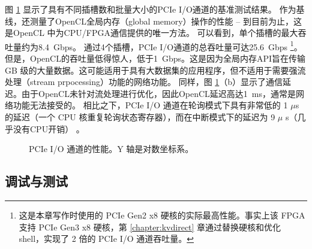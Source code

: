 图 \ref {clicknp:fig:pcie} 显示了具有不同插槽数和批量大小的PCIe I/O通道的基准测试结果。
作为基线，还测量了OpenCL全局内存（global memory）操作的性能 -- 到目前为止，这是OpenCL \cite {opencl} 中为CPU/FPGA通信提供的唯一方法。
可以看到，单个插槽的最大吞吐量约为8.4~Gbps。
通过4个插槽，PCIe I/O通道的总吞吐量可达25.6~Gbps \footnote{这是本章写作时使用的 PCIe Gen2 x8 硬核的实际最高性能。事实上该 FPGA 支持 PCIe Gen3 x8 硬核，第 \ref{chapter:kvdirect} 章通过替换硬核和优化 shell，实现了 2 倍的 PCIe I/O 通道吞吐量。}。
但是，OpenCL的吞吐量低得惊人，低于1~Gbps。这是因为全局内存API旨在传输 GB 级的大量数据。这可能适用于具有大数据集的应用程序，但不适用于需要强流处理（stream prpocessing）功能的网络功能。
同样，图 \ref {clicknp:fig:pcie}（b）显示了通信延迟。由于OpenCL未针对流处理进行优化，因此OpenCL延迟高达1~ms，通常是网络功能无法接受的。
相比之下，PCIe I/O 通道在轮询模式下具有非常低的 1 $\mu$s 的延迟（一个 CPU 核重复轮询状态寄存器），而在中断模式下的延迟为 9 $\mu$ s（几乎没有CPU开销） 。

\begin{figure}[htbp]
	\centering

	\caption{PCIe I/O 通道的性能。Y 轴是对数坐标系。}

	\label{clicknp:fig:pcie}
\end{figure}

\subsection{调试与测试}

